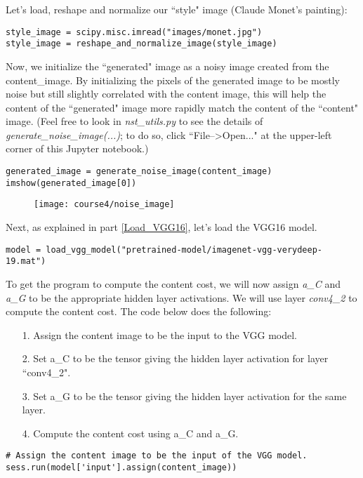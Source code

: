 {Let's load, reshape and normalize our ``style" image (Claude Monet's painting):
\begin{verbatim}
style_image = scipy.misc.imread("images/monet.jpg")
style_image = reshape_and_normalize_image(style_image)
\end{verbatim}

Now, we initialize the ``generated" image as a noisy image created from the content\_image. By initializing the pixels of the generated image to be mostly noise but still slightly correlated with the content image, this will help the content of the ``generated" image more rapidly match the content of the ``content" image. (Feel free to look in \emph{nst\_utils.py} to see the details of \emph{generate\_noise\_image(...)}; to do so, click ``File-->Open..." at the upper-left corner of this Jupyter notebook.)
\begin{verbatim}
generated_image = generate_noise_image(content_image)
imshow(generated_image[0])
\end{verbatim}
\clearpage
\begin{figure}[h]
\begin{center}
\texttt{[image: course4/noise\_image]}
\end{center}
\end{figure}

Next, as explained in part \ref{Load_VGG16}, let's load the VGG16 model.
\begin{verbatim}
model = load_vgg_model("pretrained-model/imagenet-vgg-verydeep-19.mat")
\end{verbatim}

To get the program to compute the content cost, we will now assign \emph{a\_C} and \emph{a\_G} to be the appropriate hidden layer activations. We will use layer \emph{conv4\_2} to compute the content cost. The code below does the following:
\begin{itemize}
\item[1.] Assign the content image to be the input to the VGG model.
\item[2.] Set a\_C to be the tensor giving the hidden layer activation for layer ``conv4\_2".
\item[3.] Set a\_G to be the tensor giving the hidden layer activation for the same layer. 
\item[4.] Compute the content cost using a\_C and a\_G.
\end{itemize}

\begin{verbatim}
# Assign the content image to be the input of the VGG model.  
sess.run(model['input'].assign(content_image))


\end{verbatim}}
